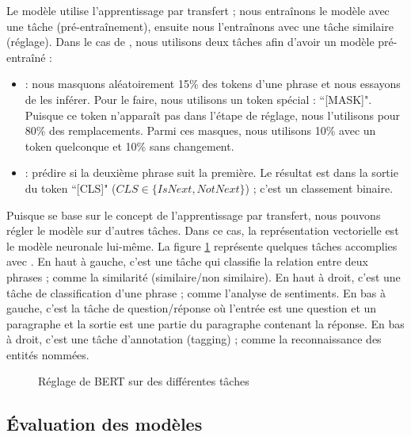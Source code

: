 \documentclass{KodeBook}
\begin{document}
Le modèle  utilise l'apprentissage par transfert ; nous entraînons le modèle avec une tâche (pré-entraînement), ensuite nous l'entraînons avec une tâche similaire (réglage). 
Dans le cas de , nous utilisons deux tâches afin d'avoir un modèle pré-entraîné : 
\begin{itemize}
	\item {} : nous masquons aléatoirement 15\% des tokens d'une phrase et nous essayons de les inférer. 
	Pour le faire, nous utilisons un token spécial : ``[MASK]". 
	Puisque ce token n'apparaît pas dans l'étape de réglage, nous l'utilisons pour 80\% des remplacements. 
	Parmi ces masques, nous utilisons 10\% avec un token quelconque et 10\% sans changement.
	
	\item {} : prédire si la deuxième phrase suit la première. 
	Le résultat est dans la sortie du token ``[CLS]" ($CLS \in \{IsNext, NotNext\}$) ; c'est un classement binaire.
\end{itemize}

Puisque  se base sur le concept de l'apprentissage par transfert, nous pouvons régler le modèle sur d'autres tâches. 
Dans ce cas, la représentation vectorielle est le modèle neuronale lui-même. 
La figure \ref{fig:bert-app} représente quelques tâches accomplies avec . 
En haut à gauche, c'est une tâche qui classifie la relation entre deux phrases ; comme la similarité (similaire/non similaire).
En haut à droit, c'est une tâche de classification d'une phrase ; comme l'analyse de sentiments.
En bas à gauche, c'est la tâche de question/réponse où l'entrée est une question et un paragraphe et la sortie est une partie du paragraphe contenant la réponse. 
En bas à droit, c'est une tâche d'annotation (tagging) ; comme la reconnaissance des entités nommées.

\begin{figure}
	\centering
	
	
	\caption[Réglage de BERT sur des différentes tâches]{Réglage de BERT sur des différentes tâches \cite{2019-devlin-al}}
	\label{fig:bert-app}
\end{figure}


\subsection{Évaluation des modèles}
\end{document}
